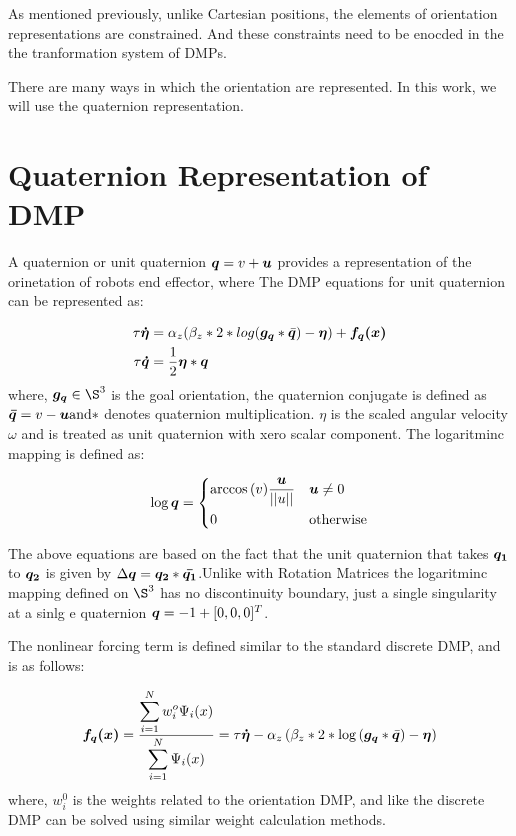

As mentioned previously, unlike Cartesian positions, the elements of orientation representations are constrained.
And these constraints need to be enocded in the the tranformation system of DMPs.

There are many ways in which the orientation are represented. In this work, we will use the quaternion representation.

\section{Quaternion Representation of DMP}
A quaternion or unit quaternion $\boldsymbol{q} = v + \boldsymbol{u}$ provides a representation of the orinetation of robots end effector, where The DMP equations for unit quaternion can be represented as:

\begin{align}
    \tau \boldsymbol{\dot{\eta}} &= \alpha_z(\beta_z * 2 * log(\boldsymbol{g_q} * \bar{\boldsymbol{q}}) - \boldsymbol{\eta}) + \boldsymbol{f_q(x)} \\
    \tau \boldsymbol{\dot{q}} &= \frac{1}{2} \boldsymbol{\eta} * \boldsymbol{q}
\end{align}
where, $\vect{g_q} \in \S^3 $ is the goal orientation, the quaternion conjugate is defined as $\boldsymbol{\bar{q}} = v - \boldsymbol{u}
\text{and} *$ denotes quaternion multiplication. $\eta$ is the scaled angular velocity $\omega$ and is
treated as unit quaternion with xero scalar component. The logaritminc mapping is defined as:

\begin{equation}
\log{\boldsymbol{q}} = 
\begin{dcases}
  \arccos{(v)} \frac{\displaystyle \boldsymbol{u}}{\displaystyle ||u||} &  \boldsymbol{u} \neq 0 \\
  0           &  \text{otherwise} 
\end{dcases}
\end{equation}

The above equations are based on the fact that the unit quaternion that takes $\boldsymbol{q_1}$ to $\boldsymbol{q_2}$
is given by $\Delta \boldsymbol{q} = \boldsymbol{q_2} * \boldsymbol{\bar{q_1}}$.Unlike with Rotation Matrices the logaritminc mapping defined on $\S^3$ has no discontinuity boundary, just a single singularity
at a sinlg e quaternion $\boldsymbol{q} = -1 + [0,0,0]^T $.

The nonlinear forcing term is defined similar to the standard discrete DMP, and is as follows:

\begin{equation}
    \boldsymbol{f_q(x)} = \frac{\displaystyle \sum\limits_{i=1}^{N} w_i^o \Psi_i(x)}{\displaystyle \sum\limits_{i=1}^N \Psi_i(x)} = 
    \tau \boldsymbol{\dot{\eta}} - \alpha_z \left(  \beta_z * 2 * \log{ \left(  \boldsymbol{g_q} * \bar{\boldsymbol{q}}\right) } - \boldsymbol{\eta} \right)
\end{equation}
where, $w_i^0$ is the weights related to the orientation DMP, and like the discrete DMP can be solved using similar weight calculation methods.

